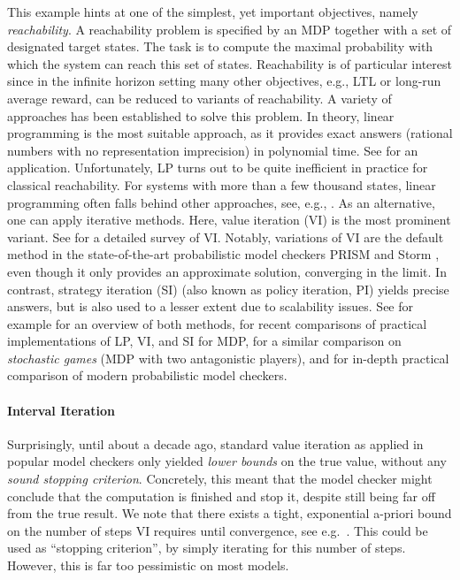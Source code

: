 \documentclass{article}
\begin{document}
This example hints at one of the simplest, yet important objectives, namely \emph{reachability}.
A reachability problem is specified by an MDP together with a set of designated target states.
The task is to compute the maximal probability with which the system can reach this set of states.
Reachability is of particular interest since in the infinite horizon setting many other objectives, e.g., LTL or long-run average reward, can be reduced to variants of reachability.
A variety of approaches has been established to solve this problem.
In theory, linear programming \cite{10.1007/BFb0032043,DBLP:conf/sfm/ForejtKNP11} is the most suitable approach, as it provides exact answers (rational numbers with no representation imprecision) in polynomial time.
See \cite{DBLP:conf/qest/BarnatBCCT08} for an application.
Unfortunately, LP turns out to be quite inefficient in practice for classical reachability.
For systems with more than a few thousand states, linear programming often falls behind other approaches, see, e.g., \cite{DBLP:conf/sfm/ForejtKNP11,DBLP:conf/cav/AshokCDKM17,DBLP:conf/tacas/HartmannsJQW23}.
As an alternative, one can apply iterative methods.
Here, value iteration (VI) \cite{howard1960dynamic} is the most prominent variant.
See \cite{DBLP:conf/spin/ChatterjeeH08} for a detailed survey of VI.
Notably, variations of VI are the default method in the state-of-the-art probabilistic model checkers PRISM \cite{DBLP:conf/cav/KwiatkowskaNP11} and Storm \cite{DBLP:conf/cav/DehnertJK017}, even though it only provides an approximate solution, converging in the limit.
In contrast, strategy iteration (SI) (also known as policy iteration, PI) \cite{howard1960dynamic,DBLP:books/wi/Puterman94,DBLP:conf/atva/KretinskyM17} yields precise answers, but is also used to a lesser extent due to scalability issues.
See for example \cite{DBLP:journals/tnn/Bertsekas17} for an overview of both methods, \cite{DBLP:conf/tacas/HartmannsJQW23,practitionersJournalPreprint} for recent comparisons of practical implementations of LP, VI, and SI for MDP, \cite{DBLP:journals/iandc/KretinskyRSW22} for a similar comparison on \emph{stochastic games} (MDP with two antagonistic players), and \cite{qcomp2023} for in-depth practical comparison of modern probabilistic model checkers.

\paragraph{Interval Iteration}
Surprisingly, until about a decade ago, standard value iteration as applied in popular model checkers only yielded \emph{lower bounds} on the true value, without any \emph{sound stopping criterion}.
Concretely, this meant that the model checker might conclude that the computation is finished and stop it, despite still being far off from the true result.
We note that there exists a tight, exponential a-priori bound on the number of steps VI requires until convergence, see e.g.\ \cite{DBLP:conf/spin/ChatterjeeH08}.
This could be used as \enquote{stopping criterion}, by simply iterating for this number of steps.
However, this is far too pessimistic on most models.
\end{document}
